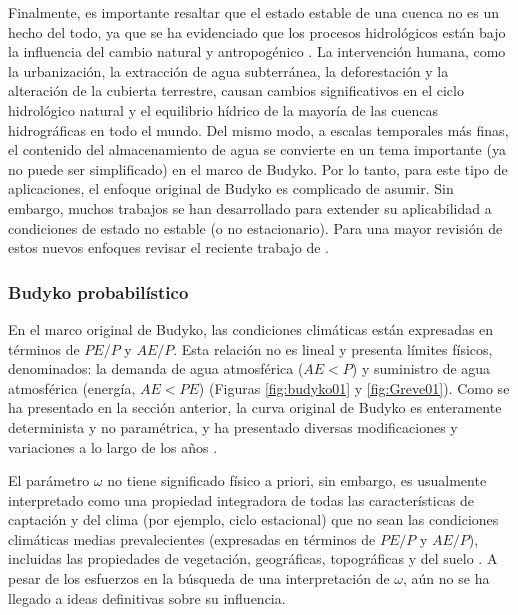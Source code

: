 \documentclass[12pt]{article}
\begin{document}
Finalmente, es importante resaltar que el estado estable de una cuenca no es un hecho del todo, ya que se ha evidenciado que los procesos hidrológicos están bajo la influencia del cambio natural y antropogénico \citep{greve2016two,moussa2016budyko,fathi2019new}. La intervención humana, como la urbanización, la extracción de agua subterránea, la deforestación y la alteración de la cubierta terrestre, causan cambios significativos en el ciclo hidrológico natural y el equilibrio hídrico de la mayoría de las cuencas hidrográficas en todo el mundo. Del mismo modo, a escalas temporales más finas, el contenido del almacenamiento de agua se convierte en un tema importante (ya no puede ser simplificado) en el marco de Budyko. Por lo tanto, para este tipo de aplicaciones, el enfoque original de Budyko es complicado de asumir. Sin embargo, muchos trabajos se han desarrollado para extender su aplicabilidad a condiciones de estado no estable (o no estacionario). Para una mayor revisión de estos nuevos enfoques revisar el reciente trabajo de \citet{mianabadi2020budyko}.

\subsubsection{Budyko probabilístico}

En el marco original de Budyko, las condiciones climáticas están expresadas en términos de $PE/P$ y $AE/P$. Esta relación no es lineal y presenta límites físicos, denominados: la demanda de agua atmosférica ($AE < P$) y suministro de agua atmosférica (energía, $AE < PE$) (Figuras \ref{fig:budyko01} y \ref{fig:Greve01}). Como se ha presentado en la sección anterior, la curva original de Budyko es enteramente determinista y no paramétrica, y ha presentado diversas modificaciones y variaciones a lo largo de los años \citep{Budyko1961,Fu1981,Koster1999,Wang2014,Zhang2004,Zhang2008,fathi2019new}. 

El parámetro $\omega$ \citep[Ecuación \ref{equ:fuEqu}]{Fu1981} no tiene significado físico a priori, sin embargo, es usualmente interpretado como una propiedad integradora de todas las características de captación y del clima (por ejemplo, ciclo estacional) que no sean las condiciones climáticas medias prevalecientes (expresadas en términos de $PE/P$ y $AE/P$), incluidas las propiedades de vegetación, geográficas, topográficas y del suelo \citep{Gentine2012,Berghuijs2014,Greve2015}. A pesar de los esfuerzos en la búsqueda de una interpretación de $\omega$, aún no se ha llegado a ideas definitivas sobre su influencia.
\end{document}
